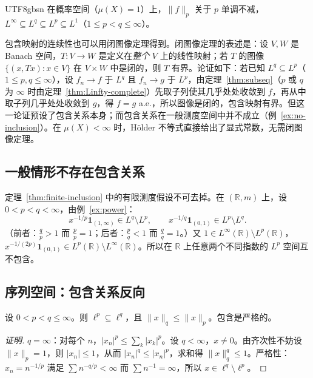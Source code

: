 \documentclass[11pt]{article}
\newcommand{\R}{\mathbb{R}}
\newcommand{\norm}[1]{\lVert #1\rVert}
\newcommand{\ind}{\mathbf{1}}
\begin{document}
\begin{CJK*}{UTF8}{gbsn}
在概率空间（$\mu(X)=1$）上，$\norm{f}_{p}$ 关于 $p$ 单调不减，$L^{\infty}\subseteq L^{q}\subseteq L^{p}\subseteq L^{1}$（$1\le p<q\le\infty$）。

\begin{remark}[关于闭图像定理]
包含映射的连续性也可以用闭图像定理得到。闭图像定理的表述是：设 $V,W$ 是 Banach 空间，$T:V\to W$ 是定义在\emph{整个} $V$ 上的线性映射；若 $T$ 的图像 $\{(x,Tx):x\in V\}$ 在 $V\times W$ 中是闭的，则 $T$ 有界。论证如下：若已知 $L^{q}\subseteq L^{p}$（$1\le p,q\le\infty$），设 $f_{n}\to f$ 于 $L^{q}$ 且 $f_{n}\to g$ 于 $L^{p}$，由定理~\ref{thm:subseq}（$p$ 或 $q$ 为 $\infty$ 时由定理~\ref{thm:Linfty-complete}）先取子列使其几乎处处收敛到 $f$，再从中取子列几乎处处收敛到 $g$，得 $f=g$ a.e.，所以图像是闭的，包含映射有界。但这一论证预设了包含关系本身；而包含关系在一般测度空间中并不成立（例~\ref{ex:no-inclusion}）。在 $\mu(X)<\infty$ 时，Hölder 不等式直接给出了显式常数，无需闭图像定理。
\end{remark}

\subsection{一般情形不存在包含关系}

\begin{example}\label{ex:no-inclusion}
定理~\ref{thm:finite-inclusion} 中的有限测度假设不可去掉。在 $(\R,m)$ 上，设 $0<p<q<\infty$，由例~\ref{ex:power}：
\[
x^{-1/p}\ind_{(1,\infty)}\in L^{q}\setminus L^{p},\qquad x^{-1/q}\ind_{(0,1)}\in L^{p}\setminus L^{q}.
\]
（前者：$\frac{q}{p}>1$ 而 $\frac pp=1$；后者：$\frac pq<1$ 而 $\frac qq=1$。）又 $1\in L^{\infty}(\R)\setminus L^{p}(\R)$，$x^{-1/(2p)}\ind_{(0,1)}\in L^{p}(\R)\setminus L^{\infty}(\R)$。所以在 $\R$ 上任意两个不同指数的 $L^{p}$ 空间互不包含。
\end{example}

\subsection{序列空间：包含关系反向}

\begin{theorem}\label{thm:lp-inclusion}
设 $0<p<q\le\infty$。则 $\ell^{p}\subseteq\ell^{q}$，且 $\norm{x}_{q}\le\norm{x}_{p}$。包含是严格的。
\end{theorem}

\begin{proof}[证明]
$q=\infty$：对每个 $n$，$|x_{n}|^{p}\le\sum_{k}|x_{k}|^{p}$。设 $q<\infty$，$x\ne0$。由齐次性不妨设 $\norm{x}_{p}=1$，则 $|x_{n}|\le1$，从而 $|x_{n}|^{q}\le|x_{n}|^{p}$，求和得 $\norm{x}_{q}^{q}\le1$。严格性：$x_{n}=n^{-1/p}$ 满足 $\sum n^{-q/p}<\infty$ 而 $\sum n^{-1}=\infty$，所以 $x\in\ell^{q}\setminus\ell^{p}$。
\end{proof}


\end{CJK*}
\end{document}
